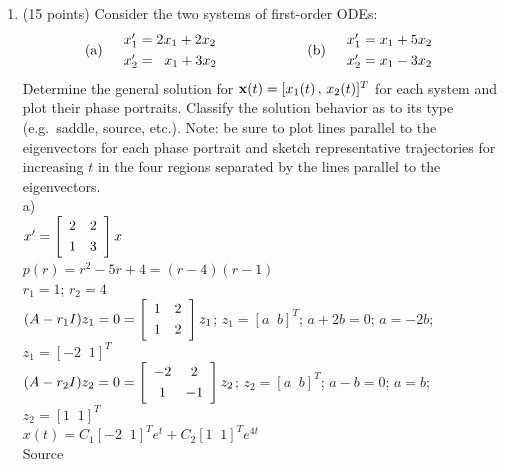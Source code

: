 \documentclass{article}
\begin{document}
\begin{enumerate}
\bigskip
\item (15 points)  Consider the two systems of first-order ODEs:
\[\hbox{(a)}\quad\begin{array}{l}x_1\sp\prime=2x_1+2x_2\smallskip\\x_2\sp\prime=\;\;x_1+3x_2\end{array}\qquad\qquad\qquad
\hbox{(b)}\quad\begin{array}{l}x_1\sp\prime=x_1+5x_2\smallskip\\x_2\sp\prime=x_1-3x_2\end{array}
\]
Determine the general solution for ${\bf x}(t)=[x_1(t)\,,\,x_2(t)]\sp{T}$ for each system and plot their phase portraits.  Classify the solution behavior as to its type (e.g.~saddle, source, etc.).  Note: be sure to plot lines parallel to the eigenvectors for each phase portrait and sketch representative trajectories for increasing $t$ in the four regions separated by the lines parallel to the eigenvectors.
\\a)
\\$x'=\left[\begin{array}{cc}2&2 \smallskip\\1&3\end{array}\right]x$
\\$p(r)=r^2-5r+4=(r-4)(r-1)$
\\$r_1=1$; $r_2=4$
\\$(A-r_1I)z_1=0=\left[\begin{array}{cc}1&2 \smallskip\\1&2\end{array}\right]z_1$; $z_1=[a\;\;b]^T$; $a+2b=0$; $a=-2b$; $z_1=[-2\;\;1]^T$
\\$(A-r_2I)z_2=0=\left[\begin{array}{cc}-2&2 \smallskip\\1&-1\end{array}\right]z_2$; $z_2=[a\;\;b]^T$; $a-b=0$; $a=b$; $z_2=[1\;\;1]^T$
\\$x(t)=C_1[-2\;\;1]^Te^{t}+C_2[1\;\;1]^Te^{4t}$
\\Source
\begin{figure}[h]

\end{figure}
\end{enumerate}
\end{document}

